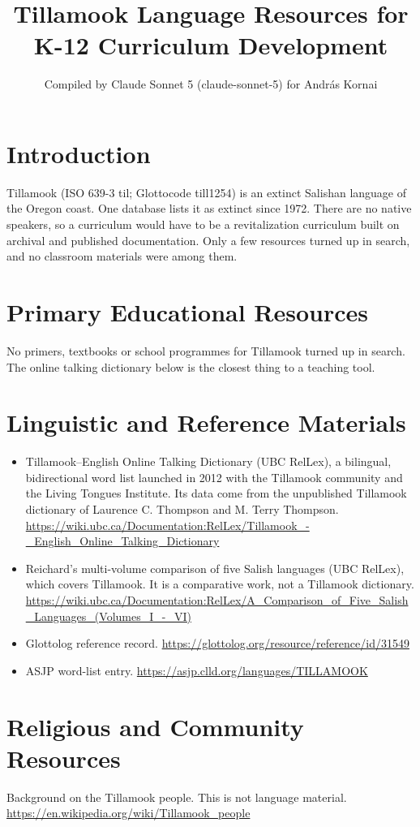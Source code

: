 \documentclass[12pt]{article}
\title{Tillamook Language Resources for K-12 Curriculum Development}
\author{Compiled by Claude Sonnet 5 (claude-sonnet-5) for Andr\'as Kornai}
\date{}
\begin{document}
\maketitle

\section{Introduction}
Tillamook (ISO 639-3 til; Glottocode till1254) is an extinct Salishan language of the Oregon coast. One database lists it as extinct since 1972. There are no native speakers, so a curriculum would have to be a revitalization curriculum built on archival and published documentation. Only a few resources turned up in search, and no classroom materials were among them.

\section{Primary Educational Resources}
No primers, textbooks or school programmes for Tillamook turned up in search. The online talking dictionary below is the closest thing to a teaching tool.

\section{Linguistic and Reference Materials}
\begin{itemize}
\item Tillamook--English Online Talking Dictionary (UBC RelLex), a bilingual, bidirectional word list launched in 2012 with the Tillamook community and the Living Tongues Institute. Its data come from the unpublished Tillamook dictionary of Laurence C. Thompson and M. Terry Thompson. \url{https://wiki.ubc.ca/Documentation:RelLex/Tillamook_-_English_Online_Talking_Dictionary}
\item Reichard's multi-volume comparison of five Salish languages (UBC RelLex), which covers Tillamook. It is a comparative work, not a Tillamook dictionary. \url{https://wiki.ubc.ca/Documentation:RelLex/A_Comparison_of_Five_Salish_Languages_(Volumes_I_-_VI)}
\item Glottolog reference record. \url{https://glottolog.org/resource/reference/id/31549}
\item ASJP word-list entry. \url{https://asjp.clld.org/languages/TILLAMOOK}
\end{itemize}

\section{Religious and Community Resources}
Background on the Tillamook people. This is not language material. \url{https://en.wikipedia.org/wiki/Tillamook_people}
\end{document}
